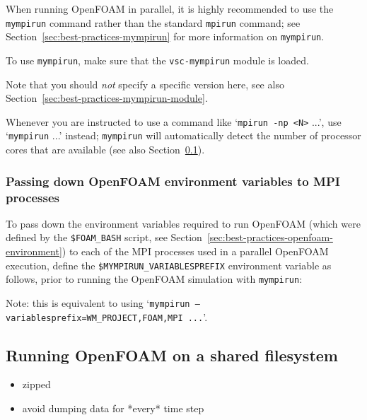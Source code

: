 When running OpenFOAM in parallel, it is highly recommended to use the \texttt{mympirun} command rather than
the standard \texttt{mpirun} command;
see Section~\ref{sec:best-practices-mympirun} for more information on \texttt{mympirun}.

To use \texttt{mympirun}, make sure that the \texttt{\small{vsc-mympirun}} module is loaded.

\begin{prompt}
\end{prompt}

Note that you should \textit{not} specify a specific version here, see also Section~\ref{sec:best-practices-mympirun-module}.

Whenever you are instructed to use a command like `\texttt{\small{mpirun -np <N>}} ...',
use `\texttt{\small{mympirun}} ...' instead; \texttt{\small{mympirun}} will automatically detect the number of
processor cores that are available (see also Section~\ref{}).

\subsubsection{Passing down OpenFOAM environment variables to MPI processes}

To pass down the environment variables required to run OpenFOAM (which were defined by the
\texttt{\small{\$FOAM\_BASH}} script, see Section~\ref{sec:best-practices-openfoam-environment})
to each of the MPI processes used in a parallel OpenFOAM execution,
define the \texttt{\small{\$MYMPIRUN\_VARIABLESPREFIX}} environment variable as follows,
prior to running the OpenFOAM simulation with \texttt{\small{mympirun}}:

\begin{prompt}
\end{prompt}

Note: this is equivalent to using `\texttt{\small{mympirun --variablesprefix=WM\_PROJECT,FOAM,MPI ...}}'.


\subsection{Running OpenFOAM on a shared filesystem}

\begin{itemize}
\item zipped
\item avoid dumping data for *every* time step
\end{itemize}

